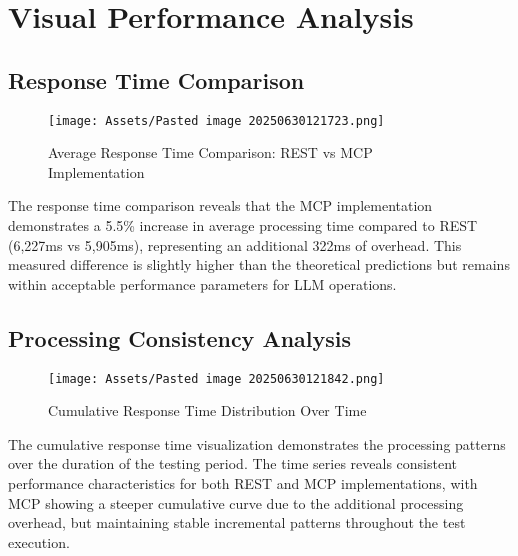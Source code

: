 \section{Visual Performance Analysis}

\subsection{Response Time Comparison}


\begin{figure}[h]
\centering
\texttt{[image: Assets/Pasted image 20250630121723.png]}
\caption{Average Response Time Comparison: REST vs MCP Implementation}
\label{fig:response_time_comparison}
\end{figure}

The response time comparison reveals that the MCP implementation demonstrates a 5.5\% increase in average processing time compared to REST (6,227ms vs 5,905ms), representing an additional 322ms of overhead. This measured difference is slightly higher than the theoretical predictions but remains within acceptable performance parameters for LLM operations.

\subsection{Processing Consistency Analysis}


\begin{figure}[h]
\centering
\texttt{[image: Assets/Pasted image 20250630121842.png]}
\caption{Cumulative Response Time Distribution Over Time}
\label{fig:cumulative_response_time}
\end{figure}

The cumulative response time visualization demonstrates the processing patterns over the duration of the testing period. The time series reveals consistent performance characteristics for both REST and MCP implementations, with MCP showing a steeper cumulative curve due to the additional processing overhead, but maintaining stable incremental patterns throughout the test execution.

